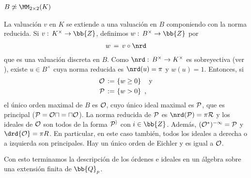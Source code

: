 \subsubsection{$B\not\simeq\MM_{2\times 2}(K)$}
La valuaci\'{o}n $v$ en $K$ se extiende a una valuaci\'{o}n en $B$
componiendo con la norma reducida. Si $v:\,K^{\times}\rightarrow\bb{Z}$,
definimos $w:\,B^{\times}\rightarrow\bb{Z}$ por
\begin{align*}
	w\,=\,v\circ\nrd
\end{align*}
%
que es una valuaci\'{o}n discreta en $B$. Como
$\nrd:\,B^{\times}\rightarrow K^{\times}$ es sobreyectiva (ver
\cite[(Weil) Ch.~???]{WeilBasic}),
existe $u\in B^{\times}$ cuya norma reducida es $\nrd(u)=\pi$ y
$w(u)=1$. Entonces, si
\begin{align*}
	\cal{O}\,:=\, & \left\lbrace w\geq 0\right\rbrace\quad\text{y}\\
	\cal{P}\,:=\, & \left\lbrace w>0 \right\rbrace\text{ ,}
\end{align*}
%
el \'{u}nico orden maximal de $B$ es $\cal{O}$, cuyo \'{u}nico ideal
maximal es $\cal{P}$, que es principal ($\cal{P}=\cal{O}u=u\cal{O}$).
La norma reducida de $\cal{P}$ es $\nrd(\cal{P})=\pi R$ y los ideales
de $\cal{O}$ son todos de la forma $\cal{P}^{i}$ con $i\in\bb{Z}$.
Adem\'{a}s, $(\cal{O}^{*})^{-1}=\cal{P}$ y $\drd{\cal{O}}=\pi R$.
En particular, en este caso tambi\'{e}n, todos los ideales a derecha o
a izquierda son principales. Hay un \'{u}nico orden de Eichler y es igual a
$\cal{O}$.

Con esto terminamos la descripci\'{o}n de los \'{o}rdenes e ideales en
un \'{a}lgebra sobre una extensi\'{o}n finita de $\bb{Q}_{p}$.
